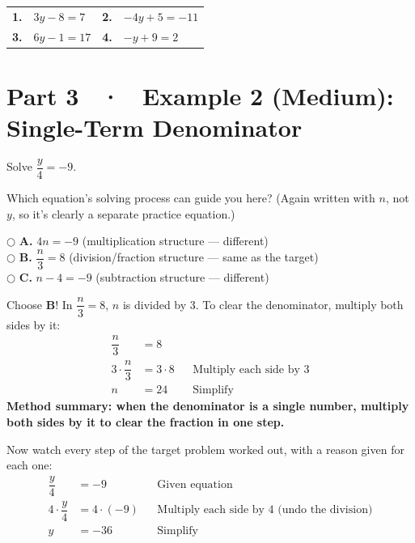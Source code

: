 \documentclass[11pt]{article}
\newcommand{\choice}[2]{\hspace{2mm}$\bigcirc$\; \textbf{#1.} #2}
\begin{document}
\begin{tabularx}{\linewidth}{@{}p{0.5cm} X p{0.5cm} X@{}}
\textbf{1.} & $3y - 8 = 7$ & \textbf{2.} & $-4y + 5 = -11$ \\[10mm]
\textbf{3.} & $6y - 1 = 17$ & \textbf{4.} & $-y + 9 = 2$ \\[10mm]
\end{tabularx}

\newpage
\section*{Part 3 \ · \ Example 2 (Medium): Single-Term Denominator}

\begin{targetbox}
Solve \; $\dfrac{y}{4} = -9$.
\end{targetbox}

\begin{choosebox}
Which equation's solving process can guide you here? (Again written with $n$, not $y$, so it's clearly a separate practice equation.)

\choice{A}{$4n = -9$ \quad (multiplication structure --- different)}\\[1mm]
\choice{B}{$\dfrac{n}{3} = 8$ \quad (division/fraction structure --- same as the target)}\\[1mm]
\choice{C}{$n - 4 = -9$ \quad (subtraction structure --- different)}
\end{choosebox}

\begin{helperbox}
Choose \textbf{B}! In $\dfrac{n}{3}=8$, $n$ is divided by 3. To clear the denominator, multiply both sides by it:
\begin{align*}
\dfrac{n}{3} &= 8\\
3\cdot\dfrac{n}{3} &= 3 \cdot 8 &&\text{Multiply each side by 3}\\
n &= 24 &&\text{Simplify}
\end{align*}
\textbf{Method summary: when the denominator is a single number, multiply both sides by it to clear the fraction in one step.}
\end{helperbox}

\begin{applybox}
Now watch every step of the target problem worked out, with a reason given for each one:
\begin{align*}
\dfrac{y}{4} &= -9 &&\text{Given equation}\\
4\cdot\dfrac{y}{4} &= 4\cdot(-9) &&\text{Multiply each side by 4 (undo the division)}\\
y &= -36 &&\text{Simplify}
\end{align*}
\end{applybox}
\end{document}
